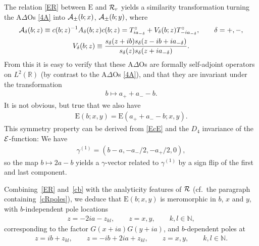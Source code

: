 \documentclass[11pt]{article}
\numberwithin{equation}{section}
\newcommand{\De}{\Delta}
\newcommand{\de}{\delta}
\newcommand{\N}{{\mathbb N}}
\newcommand{\R}{{\mathbb R}}
\newcommand{\cE}{{\cal E}}
\newcommand{\cA}{{\cal A}}
\newcommand{\cR}{{\cal R}}
\newcommand{\rE}{{\mathrm E}}
\begin{document}
The relation \eqref{ER} between $\rE$ and $\cR_r$ yields a similarity transformation turning the A$\De$Os \eqref{4A} into $\cA_{\pm}(b;x)$, $\cA_{\pm}(b;y)$,
where
\begin{gather}\label{cAdef}
\cA_{\de}(b;z)\equiv c(b;z)^{-1}A_{\de}(b;z)c(b;z)=T^z_{ia_{-\de}}+V_{\de}(b;z)T^z_{-ia_{-\de}},\qquad \de=+,-,
\\
V_{\de}(b;z)\equiv \frac{s_{\de}(z+ib)s_{\de}(z-ib +ia_{-\de})}{s_{\de}(z)s_{\de}(z+ia_{-\de})}.
\end{gather}
From this it is easy to verify that these A$\De$Os are formally self-adjoint operators on $L^2(\R)$ (by contrast to the A$\De$Os \eqref{4A}), and that they are invariant under the transformation
\begin{gather}\label{bsym}
b \mapsto a_{+}+a_{-}-b.
\end{gather}
It is not obvious, but true that we also have
\begin{gather}\label{Esym}
\rE(b;x,y)=\rE(a_{+}+a_{-}-b;x,y).
\end{gather}
This symmetry property can be derived from \eqref{EcE} and the $D_4$ invariance of the $\cE$-function: We have
\begin{gather}\label{gam1}
\gamma^{(1)}=(b-a,-a_{-}/2,-a_{+}/2,0),
\end{gather}
so the map $b\mapsto 2a-b$ yields a $\gamma$-vector related to $\gamma^{(1)}$ by a sign f\/lip of the f\/irst and last component.

Combining~\eqref{ER} and~\eqref{cb} with the analyticity features of $\cR$ (cf.~the paragraph con\-taining~\eqref{cRpoles}), we deduce that $\rE(b;x,y)$ is meromorphic in $b$, $x$ and $y$, with $b$-independent pole locations
\begin{gather}
z=-2ia-z_{kl},\qquad z=x,y,\qquad k,l\in\N,
\end{gather}
corresponding to the factor $G(x+ia)G(y+ia)$, and $b$-dependent poles at
\begin{gather}
z=ib+z_{kl},\qquad z=-ib+2ia+z_{kl},\qquad z=x,y,\qquad k,l\in\N.
\end{gather}
\end{document}
